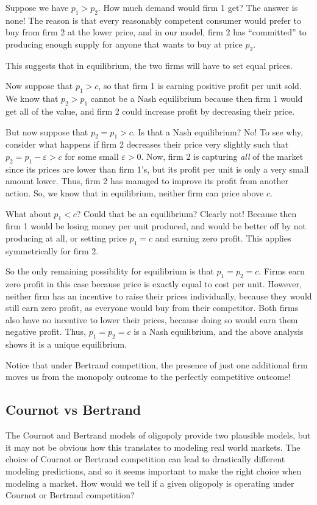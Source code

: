 Suppose we have $p_1 > p_2$. How much demand would firm 1 get? The answer is none! The reason is that every reasonably competent consumer would prefer to buy from firm 2 at the lower price, and in our model, firm 2 has ``committed'' to producing enough supply for anyone that wants to buy at price $p_2$.

This suggests that in equilibrium, the two firms will have to set equal prices. 

Now suppose that $p_1 > c$, so that firm 1 is earning positive profit per unit sold. We know that $p_2 > p_1$ cannot be a Nash equilibrium because then firm 1 would get all of the value, and firm 2 could increase profit by decreasing their price. 

But now suppose that $p_2 = p_1 > c$. Is that a Nash equilibrium? No! To see why, consider what happens if firm 2 decreases their price very slightly such that $p_2 = p_1 - \varepsilon > c$ for some small $\varepsilon > 0$. Now, firm 2 is capturing \emph{all} of the market since its prices are lower than firm 1's, but its profit per unit is only a very small amount lower. Thus, firm 2 has managed to improve its profit from another action. So, we know that in equilibrium, neither firm can price above $c$.

What about $p_1 < c$? Could that be an equilibrium? Clearly not! Because then firm 1 would be losing money per unit produced, and would be better off by not producing at all, or setting price $p_1 = c$ and earning zero profit. This applies symmetrically for firm 2.

So the only remaining possibility for equilibrium is that $p_1 = p_2 = c$. Firms earn zero profit in this case because price is exactly equal to cost per unit. However, neither firm has an incentive to raise their prices individually, because they would still earn zero profit, as everyone would buy from their competitor. Both firms also have no incentive to lower their prices, because doing so would earn them negative profit. Thus, $p_1 = p_2 = c$ is a Nash equilibrium, and the above analysis shows it is a unique equilibrium.

Notice that under Bertrand competition, the presence of just one additional firm moves us from the monopoly outcome to the perfectly competitive outcome! 

\subsection{Cournot vs Bertrand}
The Cournot and Bertrand models of oligopoly provide two plausible models, but it may not be obvious how this translates to modeling real world markets. The choice of Cournot or Bertrand competition can lead to drastically different modeling predictions, and so it seems important to make the right choice when modeling a market. How would we tell if a given oligopoly is operating under Cournot or Bertrand competition? 

